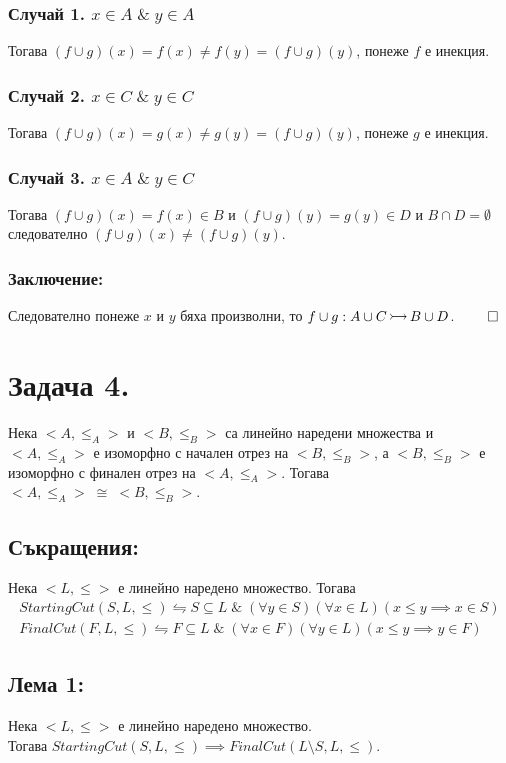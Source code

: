 \documentclass[12pt]{article}
\newcommand{\injection}[0]{\,\mathlarger{\mathlarger{\rightarrowtail}}\,}
\begin{document}
\subsubsection*{Случай 1. \(x \in A \; \& \; y \in A\)}
Тогава \((f \cup g)(x) = f(x) \neq f(y) = (f \cup g)(y)\),
понеже \(f\) е инекция.

\subsubsection*{Случай 2. \(x \in C \; \& \; y \in C\)}
Тогава \((f \cup g)(x) = g(x) \neq g(y) = (f \cup g)(y)\),
понеже \(g\) е инекция.

\subsubsection*{Случай 3. \(x \in A \; \& \; y \in C\)}
Тогава \((f \cup g)(x) = f(x) \in B\) и \((f \cup g)(y) = g(y) \in D\)
и \(B \cap D = \emptyset\) следователно \((f \cup g)(x) \neq (f \cup g)(y)\).

\subsubsection*{Заключение:}
Следователно понеже \(x\) и \(y\) бяха произволни,
то \(f \cup g : A \cup C \injection B \cup D\). \(\qed\)

\section*{Задача 4.}
Нека \(<A, \leq_A>\) и \(<B, \leq_B>\) са линейно наредени множества
и \(<A, \leq_A>\) е изоморфно с начален отрез на \(<B, \leq_B>\),
а \(<B, \leq_B>\) е изоморфно с финален отрез на \(<A, \leq_A>\).
Тогава \(<A, \leq_A> \; \cong \; <B, \leq_B>\).

\subsection*{Съкращения:}
Нека \(<L, \leq>\) е линейно наредено множество. Тогава
\begin{align*}
StartingCut(S, L, \leq) \leftrightharpoons S \subseteq L \; \& \; (\forall y \in S)(\forall x \in L)(x \leq y \implies x \in S) \\
FinalCut(F, L, \leq) \leftrightharpoons  F \subseteq L \; \& \; (\forall x \in F)(\forall y \in L)(x \leq y \implies y \in F)
\end{align*}

\subsection*{Лема 1:}
Нека \(<L, \leq>\) е линейно наредено множество.
\\
Тогава \(StartingCut(S, L, \leq) \implies FinalCut(L \setminus S, L, \leq)\).
\end{document}
